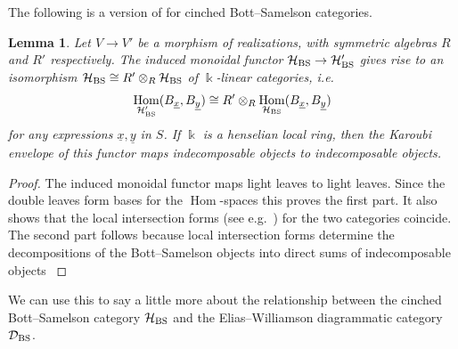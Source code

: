 \documentclass{amsart}
\theoremstyle{plain}
\newtheorem{lem}[thm]{Lemma}
\theoremstyle{definition}
\theoremstyle{remark}
\numberwithin{equation}{section}
\DeclareMathOperator{\Hom}{Hom}
\begin{document}
The following is a version of \cite[Remark~3.19]{EW-SoergelCalc} for cinched Bott--Samelson categories.

\begin{lem} \label{lem:changerlz}
Let $V \rightarrow V'$ be a morphism of realizations, with symmetric algebras $R$ and $R'$ respectively.
The induced monoidal functor $\mathcal{H}_{\rm BS} \rightarrow \mathcal{H}'_{\rm BS}$ gives rise to an isomorphism $\mathcal{H}_{\rm BS} \cong R' \otimes_{R} \mathcal{H}_{\rm BS}$ of $\Bbbk$-linear categories, i.e.
\begin{equation*}
\Hom_{\mathcal{H}'_{\rm BS}}(B_{\underline{x}},B_{\underline{y}}) \cong R' \otimes_R \Hom_{\mathcal{H}_{\rm BS}}(B_{\underline{x}},B_{\underline{y}})
\end{equation*}
for any expressions $\underline{x},\underline{y}$ in $S$.
If $\Bbbk$ is a henselian local ring, then the Karoubi envelope of this functor maps indecomposable objects to indecomposable objects. %
\end{lem}

\begin{proof}
The induced monoidal functor maps light leaves to light leaves. 
Since the double leaves form bases for the $\Hom$-spaces this proves the first part.
It also shows that the local intersection forms (see e.g.~\cite[Definition~11.74]{emtw}) for the two categories coincide. 
The second part follows because local intersection forms determine the decompositions of the Bott--Samelson objects into direct sums of indecomposable objects \cite[Corollary~11.75]{emtw}
\end{proof}

We can use this to say a little more about the relationship between the cinched Bott--Samelson category $\mathcal{H}_{\rm BS}$ and the Elias--Williamson diagrammatic category $\mathcal{D}_{\rm BS}$.
\end{document}

